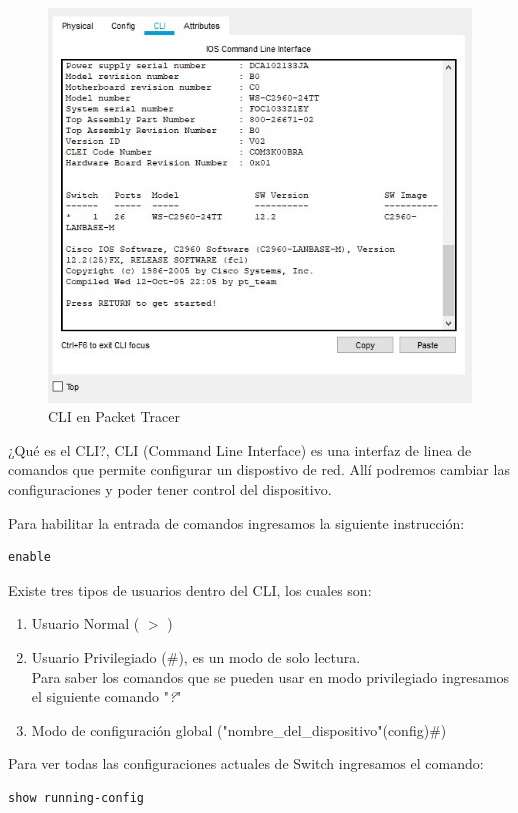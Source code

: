 \documentclass[journal]{IEEEtran}
\begin{document}
\begin{figure}[ht]
	\centering
	\includegraphics[scale=0.5]{cli.jpg}
	\caption{CLI en Packet Tracer}
\end{figure}

¿Qué es el CLI?, CLI (Command Line Interface) es una interfaz de linea de comandos que permite configurar un dispostivo de red. Allí podremos cambiar las configuraciones y poder tener control del dispositivo.

Para habilitar la entrada de comandos ingresamos la siguiente instrucción:
\begin{lstlisting}[frame=single]
enable
\end{lstlisting}

Existe tres tipos de usuarios dentro del CLI, los cuales son:
\begin{enumerate}
	\item Usuario Normal ( $>$ )
	\item Usuario Privilegiado ($\#$), es un modo de solo lectura. \\
	Para saber los comandos que se pueden usar en modo privilegiado ingresamos el siguiente comando "\textit{?}"
	\item Modo de configuración global ("nombre\_del\_dispositivo"(config)$\#$)
\end{enumerate}

Para ver todas las configuraciones actuales de Switch ingresamos el comando:
\begin{lstlisting}[frame=single]
show running-config
\end{lstlisting}
\end{document}
